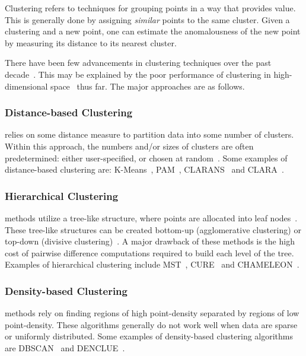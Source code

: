 Clustering refers to techniques for grouping points in a way that provides value.
This is generally done by assigning \textit{similar} points to the same cluster.
Given a clustering and a new point, one can estimate the anomalousness of the new point by measuring its distance to its nearest cluster.

There have been few advancements in clustering techniques over the past decade~\cite{wang2019progress}.
This may be explained by the poor performance of clustering in high-dimensional space~\cite{zhang2013advancements} thus far.
The major approaches are as follows.

\subsubsection{Distance-based Clustering}
\label{subsubsec:introduction:clustering-based-approaches:distance-based-clustering}
relies on some distance measure to partition data into some number of clusters.
Within this approach, the numbers and/or sizes of clusters are often predetermined: either user-specified, or chosen at random~\cite{wang2019progress}.
Some examples of distance-based clustering are:
K-Means~\cite{macqueen1967some},
PAM~\cite{kaufman2009finding},
CLARANS~\cite{ng1994efficient} and
CLARA~\cite{kaufman2009finding}.

\subsubsection{Hierarchical Clustering}
\label{subsubsec:introduction:clustering-based-approaches:hierarchical-clustering}
methods utilize a tree-like structure, where points are allocated into leaf nodes~\cite{wang2019progress}.
These tree-like structures can be created bottom-up (agglomerative clustering) or top-down (divisive clustering)~\cite{agrawal1998automatic}.
A major drawback of these methods is the high cost of pairwise difference computations required to build each level of the tree.
Examples of hierarchical clustering include
MST~\cite{charles_zahn_graph_1971},
CURE~\cite{guha1998cure} and
CHAMELEON~\cite{karypis1999hierarchical}.

\subsubsection{Density-based Clustering}
\label{subsubsec:introduction:clustering-based-approaches:density-based-clustering}
methods rely on finding regions of high point-density separated by regions of low point-density.
These algorithms generally do not work well when data are sparse or uniformly distributed.
Some examples of density-based clustering algorithms are
DBSCAN~\cite{ester1996density} and
DENCLUE~\cite{hinneburg1998efficient}.

